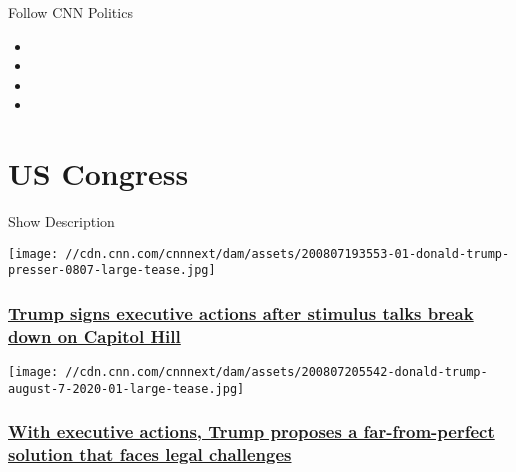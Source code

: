 Follow CNN Politics

\begin{itemize}
\item
\item
\item
\item
\end{itemize}

\hypertarget{us-congress}{%
\section{US Congress}\label{us-congress}}

Show Description

\href{/2020/08/08/politics/trump-executive-order-stimulus/index.html}{}

\texttt{[image: //cdn.cnn.com/cnnnext/dam/assets/200807193553-01-donald-trump-presser-0807-large-tease.jpg]}

\hypertarget{trump-signs-executive-actions-after-stimulus-talks-break-down-on-capitol-hill-}{%
\subsubsection{\texorpdfstring{\href{/2020/08/08/politics/trump-executive-order-stimulus/index.html}{Trump
signs executive actions after stimulus talks break down on Capitol Hill
}}{Trump signs executive actions after stimulus talks break down on Capitol Hill }}\label{trump-signs-executive-actions-after-stimulus-talks-break-down-on-capitol-hill-}}

\href{/2020/08/08/politics/trump-democrats-stimulus-talks-stalled/index.html}{}

\texttt{[image: //cdn.cnn.com/cnnnext/dam/assets/200807205542-donald-trump-august-7-2020-01-large-tease.jpg]}

\hypertarget{with-executive-actions-trump-proposes-a-far-from-perfect-solution-that-faces-legal-challenges}{%
\subsubsection{\texorpdfstring{\href{/2020/08/08/politics/trump-democrats-stimulus-talks-stalled/index.html}{With
executive actions, Trump proposes a far-from-perfect solution that faces
legal
challenges}}{With executive actions, Trump proposes a far-from-perfect solution that faces legal challenges}}\label{with-executive-actions-trump-proposes-a-far-from-perfect-solution-that-faces-legal-challenges}}

